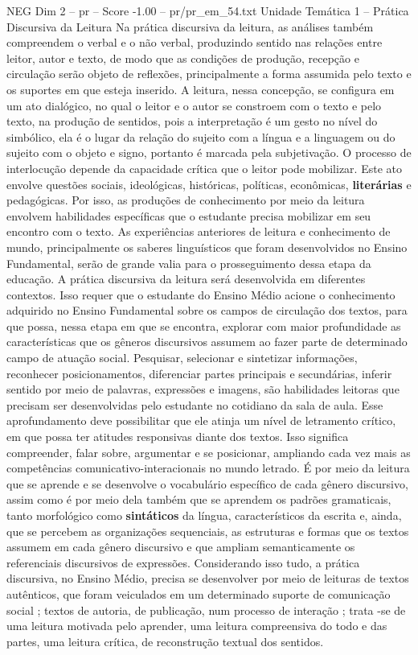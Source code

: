 \begin{textsample}{NEG Dim 2 – pr – Score -1.00 – pr/pr\_em\_54.txt}  \label{ex:f2_neg_180}
Unidade Temática 1 – Prática Discursiva da Leitura Na prática discursiva da leitura, as análises também compreendem o verbal e o não verbal, produzindo sentido nas relações entre leitor, autor e texto, de modo que as condições de produção, recepção e circulação serão objeto de reflexões, principalmente a forma assumida pelo texto e os suportes em que esteja inserido.
A leitura, nessa concepção, se configura em um ato dialógico, no qual o leitor e o autor se constroem com o texto e pelo texto, na produção de sentidos, pois a interpretação é um gesto no nível do simbólico, ela é o lugar da relação do sujeito com a língua e a linguagem ou do sujeito com o objeto e signo, portanto é marcada pela subjetivação.
O processo de interlocução depende da capacidade crítica que o leitor pode mobilizar.
Este ato envolve questões sociais, ideológicas, históricas, políticas, econômicas, \textbf{literárias} e pedagógicas.
Por isso, as produções de conhecimento por meio da leitura envolvem habilidades específicas que o estudante precisa mobilizar em seu encontro com o texto.
As experiências anteriores de leitura e conhecimento de mundo, principalmente os saberes linguísticos que foram desenvolvidos no Ensino Fundamental, serão de grande valia para o prosseguimento dessa etapa da educação.
A prática discursiva da leitura será desenvolvida em diferentes contextos.
Isso requer que o estudante do Ensino Médio acione o conhecimento adquirido no Ensino Fundamental sobre os campos de circulação dos textos, para que possa, nessa etapa em que se encontra, explorar com maior profundidade as características que os gêneros discursivos assumem ao fazer parte de determinado campo de atuação social.
Pesquisar, selecionar e sintetizar informações, reconhecer posicionamentos, diferenciar partes principais e secundárias, inferir sentido por meio de palavras, expressões e imagens, são habilidades leitoras que precisam ser desenvolvidas pelo estudante no cotidiano da sala de aula.
Esse aprofundamento deve possibilitar que ele atinja um nível de letramento crítico, em que possa ter atitudes responsivas diante dos textos.
Isso significa compreender, falar sobre, argumentar e se posicionar, ampliando cada vez mais as competências comunicativo-interacionais no mundo letrado.
É por meio da leitura que se aprende e se desenvolve o vocabulário específico de cada gênero discursivo, assim como é por meio dela também que se aprendem os padrões gramaticais, tanto morfológico como \textbf{sintáticos} da língua, característicos da escrita e, ainda, que se percebem as organizações sequenciais, as estruturas e formas que os textos assumem em cada gênero discursivo e que ampliam semanticamente os referenciais discursivos de expressões.
Considerando isso tudo, a prática discursiva, no Ensino Médio, precisa se desenvolver por meio de leituras de textos autênticos, que foram veiculados em um determinado suporte de comunicação social ; textos de autoria, de publicação, num processo de interação ; trata -se de uma leitura motivada pelo aprender, uma leitura compreensiva do todo e das partes, uma leitura crítica, de reconstrução textual dos sentidos.

\end{textsample}
